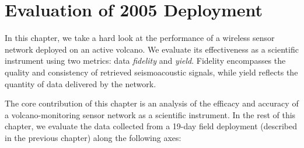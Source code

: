 \chapter{Evaluation of 2005 Deployment}
\label{chapter-evaluation}

In this chapter, we take a hard look at the performance of a wireless sensor
network deployed on an active volcano. We evaluate its effectiveness as a
scientific instrument using two metrics: data \textit{fidelity} and
\textit{yield}. Fidelity encompasses the quality and consistency of retrieved
seismoacoustic signals, while yield reflects the quantity of data delivered
by the network. 

The core contribution of this chapter is an analysis of the efficacy and
accuracy of a volcano-monitoring sensor network as a scientific instrument.
In the rest of this chapter, we evaluate the data collected from a 19-day
field deployment (described in the previous chapter) along the following
axes:

